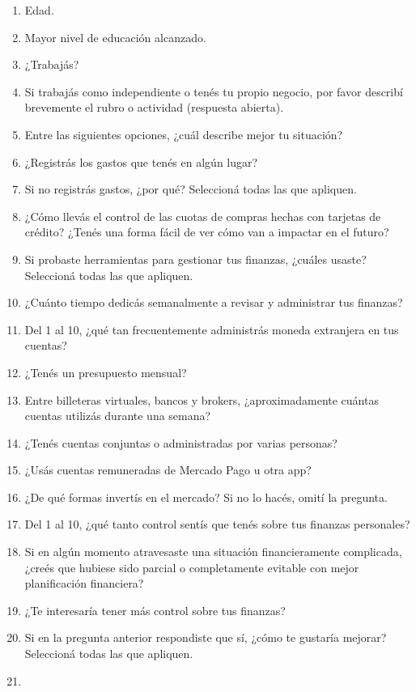 \begin{enumerate}
\def\labelenumi{\arabic{enumi}.}
\tightlist
\item
  Edad.
\item
  Mayor nivel de educación alcanzado.
\item
  ¿Trabajás?
\item
  Si trabajás como independiente o tenés tu propio negocio, por favor
  describí brevemente el rubro o actividad (respuesta abierta).
\item
  Entre las siguientes opciones, ¿cuál describe mejor tu situación?
\item
  ¿Registrás los gastos que tenés en algún lugar?
\item
  Si no registrás gastos, ¿por qué? Seleccioná todas las que apliquen.
\item
  ¿Cómo llevás el control de las cuotas de compras hechas con tarjetas
  de crédito? ¿Tenés una forma fácil de ver cómo van a impactar en el
  futuro?
\item
  Si probaste herramientas para gestionar tus finanzas, ¿cuáles usaste?
  Seleccioná todas las que apliquen.
\item
  ¿Cuánto tiempo dedicás semanalmente a revisar y administrar tus
  finanzas?
\item
  Del 1 al 10, ¿qué tan frecuentemente administrás moneda extranjera en
  tus cuentas?
\item
  ¿Tenés un presupuesto mensual?
\item
  Entre billeteras virtuales, bancos y brokers, ¿aproximadamente cuántas
  cuentas utilizás durante una semana?
\item
  ¿Tenés cuentas conjuntas o administradas por varias personas?
\item
  ¿Usás cuentas remuneradas de Mercado Pago u otra app?
\item
  ¿De qué formas invertís en el mercado? Si no lo hacés, omití la
  pregunta.
\item
  Del 1 al 10, ¿qué tanto control sentís que tenés sobre tus finanzas
  personales?
\item
  Si en algún momento atravesaste una situación financieramente
  complicada, ¿creés que hubiese sido parcial o completamente evitable
  con mejor planificación financiera?
\item
  ¿Te interesaría tener más control sobre tus finanzas?
\item
  Si en la pregunta anterior respondiste que sí, ¿cómo te gustaría
  mejorar? Seleccioná todas las que apliquen.
\item

\end{enumerate}
